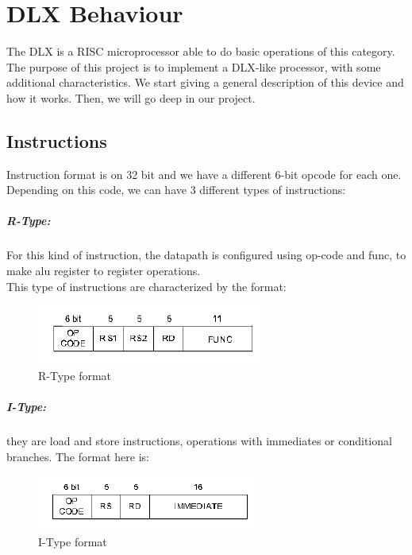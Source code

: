 %
% 
\chapter{DLX Behaviour}
\label{Summary}

The DLX is a RISC microprocessor able to do basic operations of this category. The purpose of this project is to implement a DLX-like processor, with some additional
characteristics. We start giving a general description of this device and how it works. Then, we will go deep in our project.

\section{Instructions}

Instruction format is on 32 bit and we have a different 6-bit opcode for each one. Depending on this code, we can have 3 different
types of instructions:
 
\paragraph{R-Type:}
For this kind of instruction, the datapath is configured using op-code and func, to make alu register to register operations.\\ 
This type of instructions are characterized by the format:

\begin{figure}[ht]
\centering
\includegraphics[scale = 0.9]{chapters/figures/rtype} 
\caption{R-Type format}
\label{fig:rtype}  %
\end{figure}

\paragraph{I-Type:}
they are load and store instructions, operations
with immediates or conditional branches.
The format here is:

\begin{figure}[ht]
\centering
\includegraphics[scale = 0.9]{chapters/figures/itype} 
\caption{I-Type format}
\label{fig:itype}  %
\end{figure}

